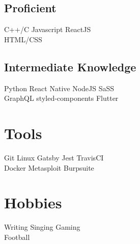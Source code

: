 \documentclass[]{deedy-resume-openfont}
\begin{document}
\begin{minipage}[t]{0.33\textwidth}
\subsection{Proficient}
C++/C \textbullet{}   Javascript \textbullet{} ReactJS \\
HTML/CSS
\sectionsep
\subsection{Intermediate Knowledge}
Python \textbullet{} React Native \textbullet{} NodeJS \textbullet{} SaSS\\
GraphQL \textbullet{} styled-components \textbullet{} Flutter


\section{Tools}
Git \textbullet{} Linux \textbullet{} Gatsby \textbullet{}  Jest \textbullet{} TravisCI \\
Docker \textbullet{}  Metasploit \textbullet{} Burpsuite 


\section{Hobbies}
Writing \textbullet{} Singing \textbullet{} Gaming \\
Football





%
%

\end{minipage} 
\hfill
\end{document}
